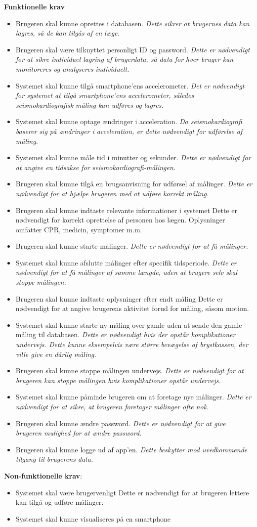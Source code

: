 \textbf{Funktionelle krav}
\begin{itemize}
    \item Brugeren skal kunne oprettes i databasen. \textit{Dette sikrer at brugernes data kan lagres, så de kan tilgås af en læge.}
    \item Brugeren skal være tilknyttet personligt ID og password. \textit{Dette er nødvendigt for at sikre individuel lagring af brugerdata, så data for hver bruger kan monitoreres og analyseres individuelt.}
    \item Systemet skal kunne tilgå smartphone'ens accelerometer. \textit{Det er nødvendigt for systemet at tilgå smartphone'ens accelerometer, således seismokardiografisk måling kan udføres og lagres.}
    \item Systemet skal kunne optage ændringer i acceleration. \textit{Da seismokardiografi baserer sig på ændringer i acceleration, er dette nødvendigt for udførelse af måling.}
    \item Systemet skal kunne måle tid i minutter og sekunder. \textit{Dette er nødvendigt for at angive en tidsakse for seismokardiografi-målingen.}
    \item Brugeren skal kunne tilgå en brugsanvisning for udførsel af målinger. \textit{Dette er nødvendigt for at hjælpe brugeren med at udføre korrekt måling.}
    \item Brugeren skal kunne indtaste relevante informationer i systemet
Dette er nødvendigt for korrekt oprettelse af personen hos lægen. Oplysninger omfatter CPR, medicin, symptomer m.m.
    \item Brugeren skal kunne starte målinger. \textit{Dette er nødvendigt for at få målinger.}
    \item Systemet skal kunne afslutte målinger efter specifik tidsperiode. \textit{Dette er nødvendigt for at få målinger af samme længde, uden at brugere selv skal stoppe målingen.}
    \item Brugeren skal kunne indtaste oplysninger efter endt måling
Dette er nødvendigt for at angive brugerens aktivitet forud for måling, såsom motion.
    \item Systemet skal kunne starte ny måling over gamle uden at sende den gamle måling til databasen. \textit{Dette er nødvendigt hvis der opstår komplikationer undervejs. Dette kunne eksempelvis være større bevægelse af brystkassen, der ville give en dårlig måling.}
    \item Brugeren skal kunne stoppe målingen undervejs. \textit{Dette er nødvendigt for at brugeren kan stoppe målingen hvis komplikationer opstår undervejs.}
    \item Systemet skal kunne påminde brugeren om at foretage nye målinger. \textit{Dette er nødvendigt for at sikre, at brugeren foretager målinger ofte nok.}
    \item Brugeren skal kunne ændre password. \textit{Dette er nødvendigt for at give brugeren mulighed for at ændre password.}
    \item Brugeren skal kunne logge ud af app’en. \textit{Dette beskytter mod uvedkommende tilgang til brugerens data.}
\end{itemize}

\textbf{Non-funktionelle krav}:
\begin{itemize}
    \item Systemet skal være brugervenligt
Dette er nødvendigt for at brugeren lettere kan tilgå og udføre målinger.
    \item Systemet skal kunne visualiseres på en smartphone
\end{itemize}